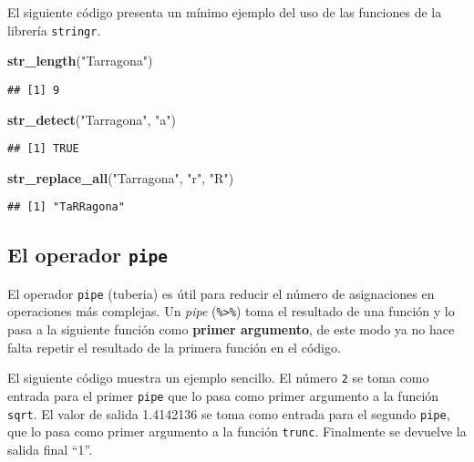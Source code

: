 \documentclass[
]{book}
\newenvironment{Shaded}{\begin{snugshade}}{\end{snugshade}}
\newcommand{\KeywordTok}[1]{\textcolor[rgb]{0.13,0.29,0.53}{\textbf{#1}}}
\newcommand{\NormalTok}[1]{#1}
\newcommand{\StringTok}[1]{\textcolor[rgb]{0.31,0.60,0.02}{#1}}
\begin{document}
El siguiente código presenta un mínimo ejemplo del uso de las funciones de la librería \texttt{stringr}.

\begin{Shaded}
\begin{Highlighting}[]
\KeywordTok{str_length}\NormalTok{(}\StringTok{"Tarragona"}\NormalTok{)}
\end{Highlighting}
\end{Shaded}

\begin{verbatim}
## [1] 9
\end{verbatim}

\begin{Shaded}
\begin{Highlighting}[]
\KeywordTok{str_detect}\NormalTok{(}\StringTok{"Tarragona"}\NormalTok{, }\StringTok{"a"}\NormalTok{)}
\end{Highlighting}
\end{Shaded}

\begin{verbatim}
## [1] TRUE
\end{verbatim}

\begin{Shaded}
\begin{Highlighting}[]
\KeywordTok{str_replace_all}\NormalTok{(}\StringTok{"Tarragona"}\NormalTok{, }\StringTok{"r"}\NormalTok{, }\StringTok{"R"}\NormalTok{)}
\end{Highlighting}
\end{Shaded}

\begin{verbatim}
## [1] "TaRRagona"
\end{verbatim}

\hypertarget{el-operador-pipe}{%
\subsection{\texorpdfstring{El operador \texttt{pipe}}{El operador pipe}}\label{el-operador-pipe}}

El operador \texttt{pipe} (tuberia) es útil para reducir el número de asignaciones en operaciones más complejas. Un \emph{pipe} (\texttt{\%\textgreater{}\%}) toma el resultado de una función y lo pasa a la siguiente función como \textbf{primer argumento}, de este modo ya no hace falta repetir el resultado de la primera función en el código.

El siguiente código muestra un ejemplo sencillo. El número \texttt{2} se toma como entrada para el primer \texttt{pipe} que lo pasa como primer argumento a la función \texttt{sqrt}. El valor de salida 1.4142136 se toma como entrada para el segundo \texttt{pipe}, que lo pasa como primer argumento a la función \texttt{trunc}. Finalmente se devuelve la salida final ``1''.
\end{document}
